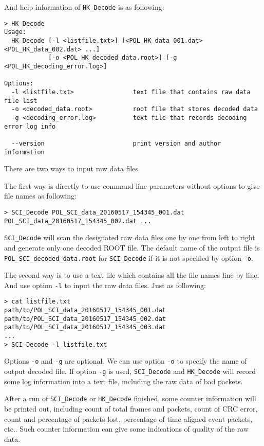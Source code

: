\documentclass[a4paper, 12pt, onecolumn]{article}
\begin{document}
And help information of \texttt{HK\_Decode} is as following:
\begin{Verbatim}[fontsize=\scriptsize, frame=single]
> HK_Decode
Usage:
  HK_Decode [-l <listfile.txt>] [<POL_HK_data_001.dat> <POL_HK_data_002.dat> ...]
            [-o <POL_HK_decoded_data.root>] [-g <POL_HK_decoding_error.log>]

Options:
  -l <listfile.txt>                text file that contains raw data file list
  -o <decoded_data.root>           root file that stores decoded data
  -g <decoding_error.log>          text file that records decoding error log info

  --version                        print version and author information
\end{Verbatim}

There are two ways to input raw data files.

The first way is directly to use command line parameters without options to give file names as following:

\begin{Verbatim}[fontsize=\scriptsize, frame=single]
> SCI_Decode POL_SCI_data_20160517_154345_001.dat POL_SCI_data_20160517_154345_002.dat ...
\end{Verbatim}

\texttt{SCI\_Decode} will scan the designated raw data files one by one from left to right and generate only one decoded ROOT file.
The default name of the output file is \texttt{POL\_SCI\_decoded\_data.root} for \texttt{SCI\_Decode} if it is not specified by option \texttt{-o}.

The second way is to use a text file which contains all the file names line by line. And use option \texttt{-l} to input the raw data files. Just as following:

\begin{Verbatim}[fontsize=\scriptsize, frame=single]
> cat listfile.txt
path/to/POL_SCI_data_20160517_154345_001.dat
path/to/POL_SCI_data_20160517_154345_002.dat
path/to/POL_SCI_data_20160517_154345_003.dat
...
> SCI_Decode -l listfile.txt
\end{Verbatim}

Options \texttt{-o} and \texttt{-g} are optional. We can use option \texttt{-o} to specify the name of output decoded file.
If option \texttt{-g} is used, \texttt{SCI\_Decode} and \texttt{HK\_Decode} will record some log information into a text file,
including the raw data of bad packets.

After a run of \texttt{SCI\_Decode} or \texttt{HK\_Decode} finished, some counter information will be printed out,
including count of total frames and packets, count of CRC error, count and percentage of packets lost, percentage of time aligned event packets, etc..
Such counter information can give some indications of quality of the raw data.
\end{document}
